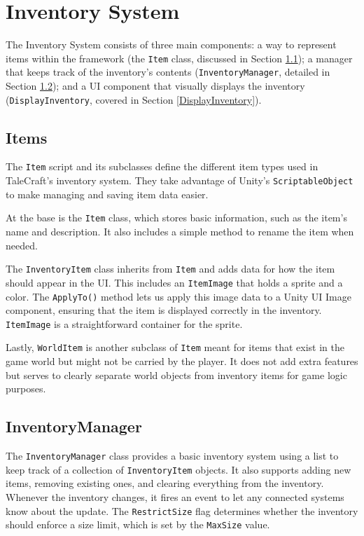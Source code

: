 \section{Inventory System}
\label{InventorySystem}
The Inventory System consists of three main components: a way to represent items within the framework (the \verb|Item| class, discussed in Section \ref{Items}); a manager that keeps track of the inventory’s contents (\verb|InventoryManager|, detailed in Section \ref{InventoryManager}); and a UI component that visually displays the inventory (\verb|DisplayInventory|, covered in Section \ref{DisplayInventory}). 

\subsection{Items}
\label{Items}
The \verb|Item| script and its subclasses define the different item types used in TaleCraft’s inventory system. They take advantage of Unity’s \verb|ScriptableObject| to make managing and saving item data easier.

At the base is the \verb|Item| class, which stores basic information, such as the item’s name and description. It also includes a simple method to rename the item when needed.

The \verb|InventoryItem| class inherits from \verb|Item| and adds data for how the item should appear in the UI. This includes an \verb|ItemImage| that holds a sprite and a color. The \verb|ApplyTo()| method lets us apply this image data to a Unity UI Image component, ensuring that the item is displayed correctly in the inventory. \verb|ItemImage| is a straightforward container for the sprite.

Lastly, \verb|WorldItem| is another subclass of \verb|Item| meant for items that exist in the game world but might not be carried by the player. It does not add extra features but serves to clearly separate world objects from inventory items for game logic purposes.
 
\subsection{InventoryManager}
\label{InventoryManager}
The \verb|InventoryManager| class provides a basic inventory system using a list to keep track of a collection of \verb|InventoryItem| objects. It also supports adding new items, removing existing ones, and clearing everything from the inventory. Whenever the inventory changes, it fires an event to let any connected systems know about the update. The \verb|RestrictSize| flag determines whether the inventory should enforce a size limit, which is set by the \verb|MaxSize| value.

